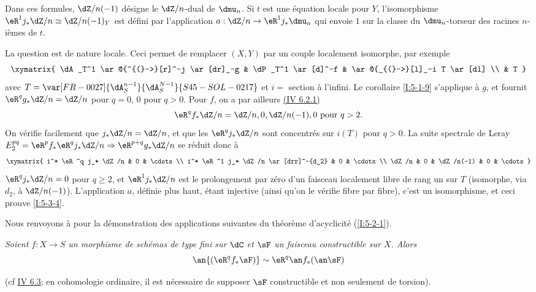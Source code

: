 Dans ces formules, $\dZ/n(-1)$ désigne le $\dZ/n$-dual de $\dmu_n$. Si $t$ 
est une équation locale pour $Y$, l'isomorphisme 
$\eR^1j_*\dZ/n\simeq\dZ/n(-1)_Y$ est défini par l'application 
$a:\dZ/n\to \eR^1j_*\dmu_n$ qui envoie $1$ sur la classe du $\dmu_n$-torseur des 
racines $n$-ièmes de $t$. 

La question est de nature locale. Ceci permet de remplacer $(X,Y)$ par un 
couple localement isomorphe, par exemple 
\[\xymatrix{
  \dA_T^1 \ar@{^{(}->}[r]^-j \ar[dr]_-g 
    & \dP_T^1 \ar[d]^-f 
    & \ar@{_{(}->}[l]_-i T \ar[dl] \\
  & T
}\]
avec $T=\var[FR-0027]{\dA_S^{n-1}}{\dA_S^{N-1}}{S45-SOL-0217}$ et $i=$ section à l'infini. Le corollaire \ref{I:5-1-9} 
s'applique à $g$, et fournit $\eR^q g_* \dZ/n=\dZ/n$ pour $q=0$, $0$ pour $q>0$. 
Pour $f$, on a par ailleurs \hyperref[I:eq:4-6-2-1]{(IV 6.2.1)}
\[
  \eR^q f_* \dZ/n = \dZ/n,0,\dZ/n(-1),0 \text{ pour $q>2$.}
\]
On vérifie facilement que $j_* \dZ/n = \dZ/n$, et que les $\eR^q j_*\dZ/n$ 
sont concentrés sur $i(T)$ pour $q>0$. La suite spectrale de Leray 
$E_2^{pq} = \eR^p f_* \eR^q j_*\dZ/n \Rightarrow \eR^{p+q}g_* \dZ/n$ se réduit 
donc à 
\[\xymatrix{
  i^* \eR^q j_* \dZ/n & 0 & \cdots \\
  i^* \eR^1 j_* \dZ/n \ar[drr]^-{d_2} & 0 & \cdots \\
  \dZ/n              & 0 & \dZ/n(-1) & 0 & \cdots
}\]
$\eR^q j_*\dZ/n=0$ pour $q\geqslant 2$, et $\eR^1 j_*\dZ/n$ est le prolongement 
par zéro d'un faisceau localement libre de rang un sur $T$ (isomorphe, via 
$d_2$, à $\dZ/n(-1)$). L'application $a$, définie plus haut, étant 
injective (ainsi qu'on le vérifie fibre par fibre), c'est un isomorphisme, et 
ceci prouve \ref{I:5-3-4}. 





\begin{sourcebareinline}\label{I:5-3-5}
Nous renvoyons à  pour la
démonstration des applications suivantes du théorème d'acyclicité
(\ref{I:5-2-1}).
\end{sourcebareinline}





\begingroup
\renewcommand*{\thesubsubsection}{3.5.1}
\begin{sourceinline}\label{I:5-3-6} %
\itshape
Soient $f:X\to S$ un morphisme de schémas de type fini sur $\dC$ et $\sF$ un 
faisceau constructible sur $X$. Alors 
\[
  \an{(\eR^q f_*\sF)} \sim \eR^q \an f_* (\an\sF)
\]
\end{sourceinline}
\endgroup
(cf \hyperref[I:4-6-3]{IV 6.3}; en cohomologie ordinaire, il est nécessaire
de supposer $\sF$ constructible et non seulement de torsion).





